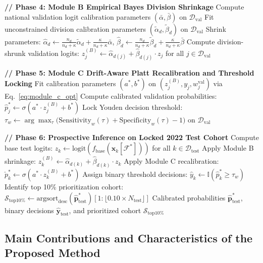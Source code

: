 \documentclass[a4paper,fleqn]{cas-sc}
\begin{document}
\begin{algorithm}[!htbp]
\begin{algorithmic}[1]
\Statex \textbf{// Phase 4: Module B Empirical Bayes Division Shrinkage}
\State Compute national validation logit calibration parameters $(\bar{\alpha}, \bar{\beta})$ on $\mathcal{D}_{\text{val}}$
    \State Fit unconstrained division calibration parameters $(\tilde{\alpha}_d, \tilde{\beta}_d)$ on $\mathcal{D}_{\text{val}}$
    \State Shrink parameters: $\hat{\alpha}_d \gets \frac{n_d}{n_d + \kappa} \tilde{\alpha}_d + \frac{\kappa}{n_d + \kappa} \bar{\alpha}$, \quad $\hat{\beta}_d \gets \frac{n_d}{n_d + \kappa} \tilde{\beta}_d + \frac{\kappa}{n_d + \kappa} \bar{\beta}$
\EndFor
\State Compute division-shrunk validation logits: $z_j^{(B)} \gets \hat{\alpha}_{d(j)} + \hat{\beta}_{d(j)} \cdot z_j$ for all $j \in \mathcal{D}_{\text{val}}$

\Statex \textbf{// Phase 5: Module C Drift-Aware Platt Recalibration and Threshold Locking}
\State Fit calibration parameters $(a^*, b^*)$ on $(z_j^{(B)}, y_j, w_j^{\text{val}})$ via Eq.~\eqref{eq:module_c_opt}
\State Compute calibrated validation probabilities: $\hat{p}_j^* \gets \sigma(a^* \cdot z_j^{(B)} + b^*)$
\State Lock Youden decision threshold: $\tau_w \gets \arg\max_{\tau} \big( \text{Sensitivity}_w(\tau) + \text{Specificity}_w(\tau) - 1 \big)$ on $\mathcal{D}_{\text{val}}$

\Statex \textbf{// Phase 6: Prospective Inference on Locked 2022 Test Cohort}
\State Compute base test logits: $z_k \gets \text{logit}(f_{\text{base}}(\mathbf{x}_k[\mathcal{F}^*]))$ for all $k \in \mathcal{D}_{\text{test}}$
\State Apply Module B shrinkage: $z_k^{(B)} \gets \hat{\alpha}_{d(k)} + \hat{\beta}_{d(k)} \cdot z_k$
\State Apply Module C recalibration: $\hat{p}_k^* \gets \sigma(a^* \cdot z_k^{(B)} + b^*)$
\State Assign binary threshold decisions: $\hat{y}_k \gets \mathbb{I}(\hat{p}_k^* \ge \tau_w)$
\State Identify top 10\% prioritization cohort: $\mathcal{S}_{\text{top10\%}} \gets \text{argsort}_{\text{desc}}(\hat{\mathbf{p}}_{\text{test}}^*)[1 : \lfloor 0.10 \times N_{\text{test}} \rfloor]$
\State \Return Calibrated probabilities $\hat{\mathbf{p}}_{\text{test}}^*$, binary decisions $\hat{\mathbf{y}}_{\text{test}}$, and prioritized cohort $\mathcal{S}_{\text{top10\%}}$
\end{algorithmic}
\end{algorithm}

\subsection{Main Contributions and Characteristics of the Proposed Method}
\label{sec:swift_contributions}
\end{document}
